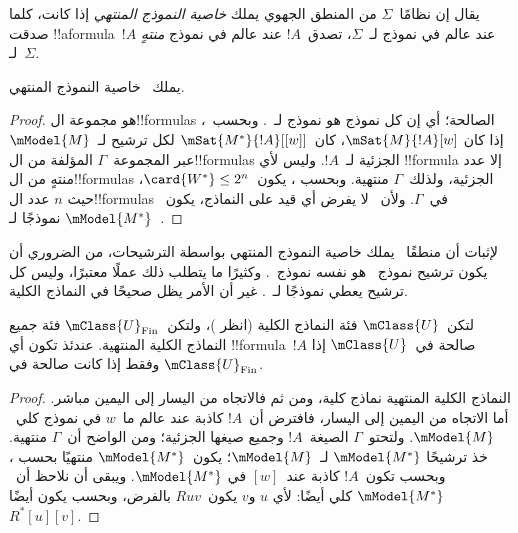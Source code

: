 \documentclass[../../../include/open-logic-section]{subfiles}
\begin{document}


\begin{defn}
  يقال إن نظامًا~$\Sigma$ من المنطق الجهوي يملك \emph{خاصية النموذج
    المنتهي} إذا كانت، كلما صدقت !!a{formula}~$!A$ عند عالم في نموذج
  لـ~$\Sigma$، تصدق~$!A$ عند عالم في نموذج \emph{منتهٍ} لـ~$\Sigma$.
\end{defn}

\begin{prop}
  يملك~ خاصية النموذج المنتهي.
\end{prop}

\begin{proof}
   هو مجموعة ال!!{formula}s الصالحة؛ أي إن كل نموذج هو نموذج
  لـ~. وبحسب~، إذا كان
  $\mSat{M}{!A}[w]$، كان~$\mSat{M^*}{!A}[{[w]}]$ لكل ترشيح
  لـ~$\mModel{M}$ عبر المجموعة~$\Gamma$ المؤلفة من ال!!{formula}s
  الجزئية لـ~$!A$. وليس لأي !!{formula} إلا عدد منتهٍ من
  ال!!{formula}s الجزئية، ولذلك~$\Gamma$ منتهية. وبحسب
  ، يكون~$\card{W^*} \le 2^n$، حيث
  $n$ عدد ال!!{formula}s في~$\Gamma$. ولأن~ لا يفرض أي قيد على
  النماذج، يكون~$\mModel{M^*}$ نموذجًا لـ~.
\end{proof}

لإثبات أن منطقًا~ يملك خاصية النموذج المنتهي بواسطة الترشيحات، من
الضروري أن يكون ترشيح نموذج~ هو نفسه نموذج~. وكثيرًا ما
يتطلب ذلك عملًا معتبرًا، وليس كل ترشيح يعطي نموذجًا لـ~. غير أن
الأمر يظل صحيحًا في النماذج الكلية.

\begin{prop}
  لتكن~$\mClass{U}$ فئة النماذج الكلية (انظر
  )، ولتكن~$\mClass{U}_\mathrm{Fin}$
  فئة جميع النماذج الكلية المنتهية. عندئذ تكون أي !!{formula}~$!A$
  صالحة في~$\mClass{U}$ إذا وفقط إذا كانت صالحة في
  $\mClass{U}_\mathrm{Fin}$.
\end{prop}

\begin{proof}
  النماذج الكلية المنتهية نماذج كلية، ومن ثم فالاتجاه من اليسار إلى اليمين
  مباشر. أما الاتجاه من اليمين إلى اليسار، فافترض أن~$!A$ كاذبة عند عالم
  ما~$w$ في نموذج كلي~$\mModel{M}$. ولتحتو~$\Gamma$ الصيغة~$!A$ وجميع
  صيغها الجزئية؛ ومن الواضح أن~$\Gamma$ منتهية. خذ ترشيحًا
  $\mModel{M^*}$ لـ~$\mModel{M}$؛ يكون~$\mModel{M^*}$ منتهيًا بحسب
  ، وبحسب
   تكون~$!A$ كاذبة عند~$[w]$ في
  $\mModel{M^*}$. ويبقى أن نلاحظ أن~$\mModel{M^*}$ كلي أيضًا: لأي
  $u$ و$v$ يكون~$Ruv$ بالفرض، وبحسب
   يكون أيضًا
  $R^*[u][v]$.
\end{proof}
\end{document}
